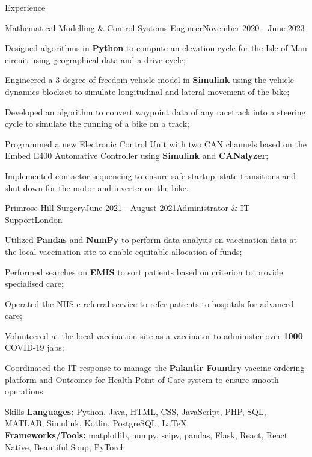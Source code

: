 \documentclass{resume}
\begin{document}
\begin{rSection}{Experience}
        \vspace{-0.4cm}

        \begin{rSubsection}{}{}{Mathematical Modelling \& Control Systems Engineer}{November 2020 - June 2023}{}
            \item Designed algorithms in \textbf{Python} to compute an elevation cycle for the Isle of Man circuit using geographical data and a drive cycle;
            \item Engineered a 3 degree of freedom vehicle model in \textbf{Simulink} using the vehicle dynamics blockset to simulate longitudinal and lateral movement of the bike;
            \item Developed an algorithm to convert waypoint data of any racetrack into a steering cycle to simulate the running of a bike on a track;
            \item Programmed a new Electronic Control Unit with two CAN channels based on the Embed E400 Automative Controller using \textbf{Simulink} and \textbf{CANalyzer};
            \item Implemented contactor sequencing to ensure safe startup, state transitions and shut down for the motor and inverter on the bike.       
        \end{rSubsection}


        \begin{rSubsection}{Primrose Hill Surgery}{June 2021 - August 2021}{Administrator \& IT Support}{London}{}
            \item Utilized \textbf{Pandas} and \textbf{NumPy} to perform data analysis on vaccination data at the local vaccination site to enable equitable allocation of funds;
            \item Performed searches on \textbf{EMIS} to sort patients based on criterion to provide specialised care;
            \item Operated the NHS e-referral service to refer patients to hospitals for advanced care;
            \item Volunteered at the local vaccination site as a vaccinator to administer over \textbf{1000} COVID-19 jabs;
            \item Coordinated the IT response to manage the \textbf{Palantir Foundry} vaccine ordering platform and Outcomes for Health Point of Care system to ensure smooth operations.
        \end{rSubsection}
    \end{rSection}

    \begin{rSection}{Skills}
        \textbf{Languages:} Python, Java, HTML, CSS, JavaScript, PHP, SQL, MATLAB, Simulink, Kotlin, PostgreSQL, \LaTeX\\
        \textbf{Frameworks/Tools:} matplotlib, numpy, scipy, pandas, Flask, React, React Native, Beautiful Soup, PyTorch \\ 
    \end{rSection}
\end{document}
